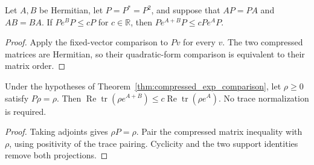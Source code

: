 \begin{theorem}
  \label{thm:compressed_exp_comparison}
  \leanok
  Let $A,B$ be Hermitian, let $P=P^*=P^2$, and suppose that $AP=PA$
  and $AB=BA$. If $Pe^BP\leq cP$ for $c\in\mathbb R$, then
  $Pe^{A+B}P\leq cPe^AP$.
\end{theorem}
\begin{proof}
  \leanok
  Apply the fixed-vector comparison to $Pv$ for every $v$.
  The two compressed matrices are Hermitian, so their quadratic-form
  comparison is equivalent to their matrix order.
\end{proof}

\begin{theorem}
  \label{thm:supported_density_exp_comparison}
  \leanok
  Under the hypotheses of Theorem~\ref{thm:compressed_exp_comparison},
  let $\rho\geq0$ satisfy $P\rho=\rho$. Then
  $\operatorname{Re}\operatorname{tr}(\rho e^{A+B})
  \leq c\operatorname{Re}\operatorname{tr}(\rho e^A)$.
  No trace normalization is required.
\end{theorem}
\begin{proof}
  \leanok
  Taking adjoints gives $\rho P=\rho$. Pair the compressed matrix
  inequality with $\rho$, using positivity of the trace pairing.
  Cyclicity and the two support identities remove both projections.
\end{proof}
